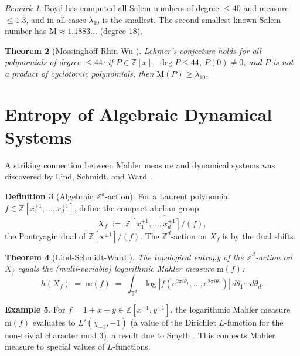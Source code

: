 \documentclass[12pt,a4paper]{amsart}
\newtheorem{theorem}{Theorem}[section]
\theoremstyle{definition}
\newtheorem{definition}[theorem]{Definition}
\newtheorem{example}[theorem]{Example}
\theoremstyle{remark}
\newtheorem{remark}[theorem]{Remark}
\newcommand{\Z}{\mathbb{Z}}
\newcommand{\T}{\mathbb{T}}
\newcommand{\M}{\mathrm{M}}
\newcommand{\m}{\mathrm{m}}
\begin{document}
\begin{remark}
  Boyd \cite{Boyd1977,Boyd1981} has computed all Salem numbers of degree $\leq 40$ and
  measure $\leq 1.3$, and in all cases $\lambda_{10}$ is the smallest. The second-smallest
  known Salem number has $\M \approx 1.1883\ldots$ (degree 18).
\end{remark}

\begin{theorem}[Mossinghoff-Rhin-Wu \cite{MRW2008}]
  Lehmer's conjecture holds for all polynomials of degree $\leq 44$: if
  $P \in \Z[x]$, $\deg P \leq 44$, $P(0) \neq 0$, and $P$ is not a product of
  cyclotomic polynomials, then $\M(P) \geq \lambda_{10}$.
\end{theorem}

\section{Entropy of Algebraic Dynamical Systems}\label{sec:entropy}

A striking connection between Mahler measure and dynamical systems was discovered by
Lind, Schmidt, and Ward \cite{LSW1990}.

\begin{definition}[Algebraic $\Z^d$-action]
  For a Laurent polynomial $f \in \Z[x_1^{\pm 1},\ldots,x_d^{\pm 1}]$, define the
  compact abelian group
  \[
    X_f \;:=\; \widehat{\Z[x_1^{\pm 1},\ldots,x_d^{\pm 1}]/(f)},
  \]
  the Pontryagin dual of $\Z[\mathbf{x}^{\pm 1}]/(f)$.
  The $\Z^d$-action on $X_f$ is by the dual shifts.
\end{definition}

\begin{theorem}[Lind-Schmidt-Ward \cite{LSW1990}]\label{thm:lsw}
  The topological entropy of the $\Z^d$-action on $X_f$ equals
  the (multi-variable) logarithmic Mahler measure $\m(f)$:
  \[
    h(X_f) \;=\; \m(f) \;=\; \int_{\T^d} \log|f(e^{2\pi i \theta_1},\ldots,e^{2\pi i \theta_d})|\,
    d\theta_1 \cdots d\theta_d.
  \]
\end{theorem}

\begin{example}
  For $f = 1 + x + y \in \Z[x^{\pm 1}, y^{\pm 1}]$, the logarithmic Mahler measure
  $\m(f)$ evaluates to $L'(\chi_{-3}, -1)$ (a value of the Dirichlet $L$-function for
  the non-trivial character mod $3$), a result due to Smyth \cite{Smyth1981}.
  This connects Mahler measure to special values of $L$-functions.
\end{example}
\end{document}
